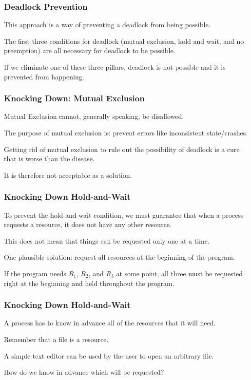 \begin{frame}
\frametitle{Deadlock Prevention}

This approach is a way of preventing a deadlock from being possible. 

The first three conditions for deadlock (mutual exclusion, hold and wait, and no preemption) are all necessary for deadlock to be possible. 

If we eliminate one of these three pillars, deadlock is not possible and it is prevented from happening.

\end{frame}

\begin{frame}
\frametitle{Knocking Down: Mutual Exclusion}

Mutual Exclusion cannot, generally speaking, be disallowed. 

The purpose of  mutual exclusion is: prevent errors like inconsistent state/crashes. 

Getting rid of mutual exclusion to rule out the possibility of deadlock is a cure that is worse than the disease.

It is therefore not acceptable as a solution.


\end{frame}

\begin{frame}
\frametitle{Knocking Down Hold-and-Wait}
 To prevent the hold-and-wait condition, we must guarantee that when a process requests a resource, it does not have any other resource. 
 
This does not mean that things can be requested only one at a time.

One plausible solution: request all resources at the beginning of the program.

If the program needs $R_{1}$, $R_{2}$, and $R_{3}$ at some point, all three must be requested right at the beginning and held throughout the program.

\end{frame}

\begin{frame}
\frametitle{Knocking Down Hold-and-Wait}

A process has to know in advance all of the resources that it will need. 

Remember that a file is a resource. 

A simple text editor can be used by the user to open an arbitrary file. 

How do we know in advance which will be requested?

\end{frame}

